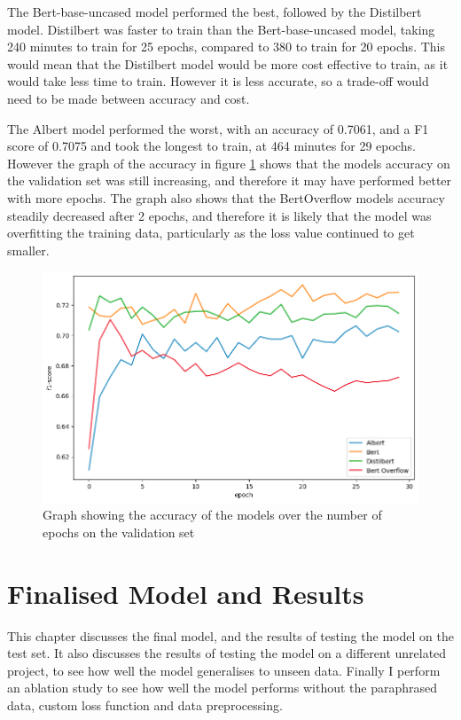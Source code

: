 \documentclass{UoYCSproject}
\begin{document}
    The Bert-base-uncased model performed the best, followed by the Distilbert model.
    Distilbert was faster to train than the Bert-base-uncased model, taking 240 minutes to train for 25 epochs, compared to 380 to train for 20 epochs.
    This would mean that the Distilbert model would be more cost effective to train, as it would take less time to train. However it is less accurate, so a trade-off would need to be made between accuracy and cost.

    The Albert model performed the worst, with an accuracy of 0.7061, and a F1 score of 0.7075 and took the longest to train, at 464 minutes for 29 epochs.
    However the graph of the accuracy in figure \ref{fig:accuracy-graph} shows that the models accuracy on the validation set was still increasing, and therefore it may have performed better with more epochs.
    The graph also shows that the BertOverflow models accuracy steadily decreased after 2 epochs, and therefore it is likely that the model was overfitting the training data, particularly as the loss value continued to get smaller.
     \par

\begin{figure}[h]
    \centering

        \includegraphics[width=12cm]{./figures/accurach-epochs}
        \caption{Graph showing the accuracy of the models over the number of epochs on the validation set}
        \label{fig:accuracy-graph}
    \end{figure}

    \chapter{Finalised Model and Results }
    \label{ch:results}

    This chapter discusses the final model, and the results of testing the model on the test set.
    It also discusses the results of testing the model on a different unrelated project, to see how well the model generalises to unseen data.
    Finally I perform an ablation study to see how well the model performs without the paraphrased data, custom loss function and data preprocessing.
\end{document}
